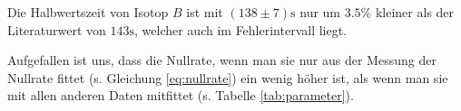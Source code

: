 \documentclass[12pt,a4paper,titlepage,headinclude,bibtotoc]{scrartcl}
\begin{document}
Die Halbwertszeit von Isotop $B$ ist mit $(138\pm 7)\si\second$ nur um $3.5\%$ kleiner als der Literaturwert von $143\si\second$, welcher auch im Fehlerintervall liegt.

Aufgefallen ist uns, dass die Nullrate, wenn man sie nur aus der Messung der Nullrate fittet (s. Gleichung \eqref{eq:nullrate}) ein wenig höher ist, als wenn man sie mit allen anderen Daten mitfittet (s. Tabelle \ref{tab:parameter}).







\end{document}
